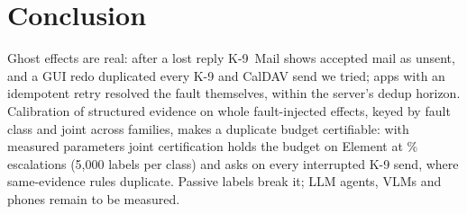 \section{Conclusion}
\label{sec:conclusion}
Ghost effects are real: after a lost reply K-9~Mail shows accepted mail as unsent, and a GUI redo duplicated every K-9 and CalDAV send we tried; apps with an idempotent
retry resolved the fault themselves, within the server's dedup horizon. Calibration of structured evidence on whole fault-injected effects, keyed by
fault class and joint across families, makes a duplicate budget certifiable: with measured parameters joint certification holds the budget on Element at
\RsimFiveJointAsk\% escalations (5{,}000 labels per class) and asks on every interrupted K-9 send, where same-evidence rules duplicate. Passive labels break it; LLM agents, VLMs and phones remain to be measured.
